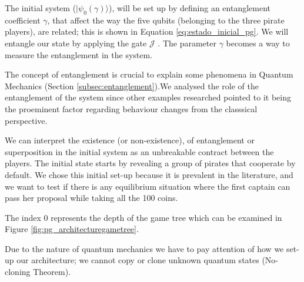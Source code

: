 The initial system ($\vert \psi_{0}(\gamma) \rangle$), will be set up by defining an entanglement coefficient $\gamma$, that affect the way the five qubits (belonging to the three pirate players), are related; this is shown in Equation \ref{eq:estado_inicial_pg}. 
We will entangle our state by applying the gate $\mathcal{J}$ \cite{Letters2002}. The parameter $\gamma$ becomes a way to measure the entanglement in the system\cite{Eisert2008}. 

The concept of entanglement is crucial to explain some phenomena in Quantum Mechanics (Section \ref{subsec:entanglement}).We analysed the role of the entanglement of the system since other examples researched pointed to it being the proeminent factor regarding behaviour changes from the classsical perspective\cite{Fra2011a}\cite{Fra2011}\cite{Letters2002}\cite{Khan2011}\cite{Ricketts2006}. 

We can interpret the existence (or non-existence), of entanglement or superposition in the initial system as an unbreakable contract between the players\cite{Piotrowski}. The initial state starts by revealing a group of pirates that cooperate by default. We chose this initial set-up because it is prevalent in the literature, and we want to test if there is any equilibrium situation where the first captain can pass her proposal while taking all the 100 coins. 


The index $0$ represents the depth of the game tree which can be examined in Figure \ref{fig:pg_architecturegametree}.

Due to the nature of quantum mechanics we have to pay attention of how we set-up our architecture; we cannot copy or clone unknown quantum states (No-cloning Theorem)\cite{Rieffel2011}. 



